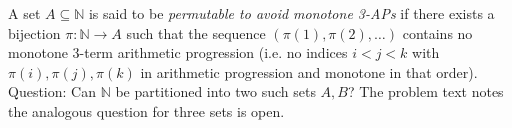 A set $A\subseteq \mathbb{N}$ is said to be \emph{permutable to avoid monotone 3-APs} if there exists a bijection
$\pi:\mathbb{N}\to A$ such that the sequence $(\pi(1),\pi(2),\dots)$ contains no monotone 3-term arithmetic progression
(i.e. no indices $i<j<k$ with $\pi(i),\pi(j),\pi(k)$ in arithmetic progression and monotone in that order).
Question: Can $\mathbb{N}$ be partitioned into two such sets $A,B$?
The problem text notes the analogous question for three sets is open.
